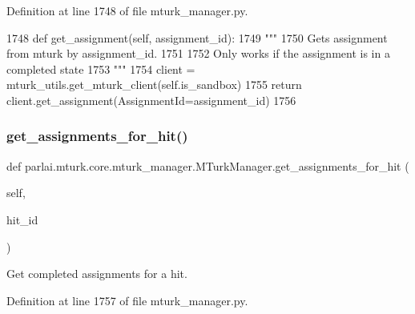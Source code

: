 Definition at line 1748 of file mturk\+\_\+manager.\+py.


\begin{DoxyCode}
1748     \textcolor{keyword}{def }get\_assignment(self, assignment\_id):
1749         \textcolor{stringliteral}{"""}
1750 \textcolor{stringliteral}{        Gets assignment from mturk by assignment\_id.}
1751 \textcolor{stringliteral}{}
1752 \textcolor{stringliteral}{        Only works if the assignment is in a completed state}
1753 \textcolor{stringliteral}{        """}
1754         client = mturk\_utils.get\_mturk\_client(self.is\_sandbox)
1755         \textcolor{keywordflow}{return} client.get\_assignment(AssignmentId=assignment\_id)
1756 
\end{DoxyCode}
\mbox{\label{classparlai_1_1mturk_1_1core_1_1mturk__manager_1_1MTurkManager_a87d3096941e232227de762b3a8260f3d}} 
\subsubsection{\texorpdfstring{get\+\_\+assignments\+\_\+for\+\_\+hit()}{get\_assignments\_for\_hit()}}
{\footnotesize\ttfamily def parlai.\+mturk.\+core.\+mturk\+\_\+manager.\+M\+Turk\+Manager.\+get\+\_\+assignments\+\_\+for\+\_\+hit (\begin{DoxyParamCaption}\item[{}]{self,  }\item[{}]{hit\+\_\+id }\end{DoxyParamCaption})}

\begin{DoxyVerb}Get completed assignments for a hit.
\end{DoxyVerb}
 

Definition at line 1757 of file mturk\+\_\+manager.\+py.


